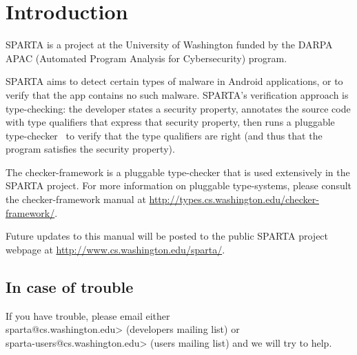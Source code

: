 \htmlhr
\chapter{Introduction\label{introduction}}

SPARTA is a project at the University of Washington funded by the DARPA
APAC (Automated Program Analysis for Cybersecurity) program.


SPARTA aims to detect certain types of malware in Android applications, or
to verify that the app contains no such malware.  SPARTA's verification
approach is type-checking:  the developer states a security property,
annotates the source code with type qualifiers that express that security
property, then runs a pluggable type-checker~\cite{PapiACPE2008,DietlDEMS2011} to verify that the type
qualifiers are right (and thus that the program satisfies the security
property).


The checker-framework is a pluggable type-checker that is used extensively in the SPARTA project. 
For more information on pluggable type-systems, please consult the checker-framework manual at 
\url{http://types.cs.washington.edu/checker-framework/}.  


Future updates to this manual will be posted to the public SPARTA project webpage at
\url{http://www.cs.washington.edu/sparta/}.


\section{In case of trouble}

If you have trouble, please email either\\
\<sparta@cs.washington.edu>
(developers mailing list) or\\
\<sparta-users@cs.washington.edu> (users
mailing list) and we will try to help.





